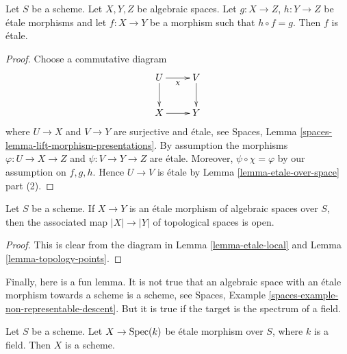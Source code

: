 \begin{lemma}
\label{lemma-etale-permanence}
Let $S$ be a scheme. Let $X, Y, Z$ be algebraic spaces.
Let $g : X \to Z$, $h : Y \to Z$ be \'etale morphisms and let
$f : X \to Y$ be a morphism such that $h \circ f = g$.
Then $f$ is \'etale.
\end{lemma}

\begin{proof}
Choose a commutative diagram
$$
\xymatrix{
U \ar[d] \ar[r]_\chi & V \ar[d] \\
X \ar[r] & Y
}
$$
where $U \to X$ and $V \to Y$ are surjective and \'etale, see
Spaces, Lemma \ref{spaces-lemma-lift-morphism-presentations}.
By assumption the morphisms $\varphi : U \to X \to Z$ and
$\psi : V \to Y \to Z$ are \'etale. Moreover, $\psi \circ \chi = \varphi$
by our assumption on $f, g, h$.
Hence $U \to V$ is \'etale by Lemma \ref{lemma-etale-over-space}
part (2).
\end{proof}

\begin{lemma}
\label{lemma-etale-open}
Let $S$ be a scheme.
If $X \to Y$ is an \'etale morphism of algebraic spaces over $S$,
then the associated map $|X| \to |Y|$ of topological spaces
is open.
\end{lemma}

\begin{proof}
This is clear from the diagram in
Lemma \ref{lemma-etale-local}
and
Lemma \ref{lemma-topology-points}.
\end{proof}

\noindent
Finally, here is a fun lemma. It is not true that an algebraic space
with an \'etale morphism towards a scheme is a scheme, see
Spaces, Example \ref{spaces-example-non-representable-descent}.
But it is true if the target is the spectrum of a field.

\begin{lemma}
\label{lemma-etale-over-field-scheme}
Let $S$ be a scheme. Let $X \to \mathop{\mathrm{Spec}}(k)$
be \'etale morphism over $S$, where $k$ is a field.
Then $X$ is a scheme.
\end{lemma}

